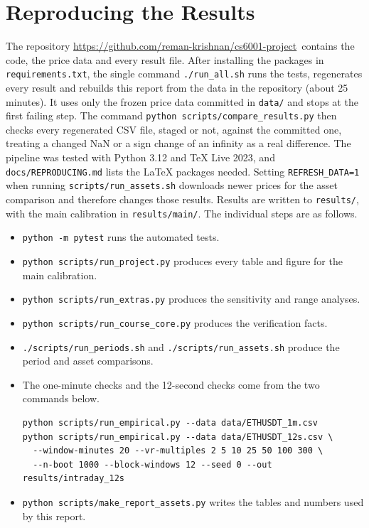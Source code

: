 \documentclass[11pt]{article}
\newcommand{\repo}{\url{https://github.com/reman-krishnan/cs6001-project}}
\begin{document}
\section{Reproducing the Results}
The repository \repo\ contains the code, the price data and every result file. After installing the packages in \verb|requirements.txt|, the single command \verb|./run_all.sh| runs the tests, regenerates every result and rebuilds this report from the data in the repository (about 25 minutes). It uses only the frozen price data committed in \verb|data/| and stops at the first failing step. The command \verb|python scripts/compare_results.py| then checks every regenerated CSV file, staged or not, against the committed one, treating a changed NaN or a sign change of an infinity as a real difference. The pipeline was tested with Python 3.12 and TeX Live 2023, and \verb|docs/REPRODUCING.md| lists the LaTeX packages needed. Setting \verb|REFRESH_DATA=1| when running \verb|scripts/run_assets.sh| downloads newer prices for the asset comparison and therefore changes those results. Results are written to \verb|results/|, with the main calibration in \verb|results/main/|. The individual steps are as follows.
\begin{itemize}\small
\item \verb|python -m pytest| runs the automated tests.
\item \verb|python scripts/run_project.py| produces every table and figure for the main calibration.
\item \verb|python scripts/run_extras.py| produces the sensitivity and range analyses.
\item \verb|python scripts/run_course_core.py| produces the verification facts.
\item \verb|./scripts/run_periods.sh| and \verb|./scripts/run_assets.sh| produce the period and asset comparisons.
\item The one-minute checks and the 12-second checks come from the two commands below.
\begin{verbatim}
python scripts/run_empirical.py --data data/ETHUSDT_1m.csv
python scripts/run_empirical.py --data data/ETHUSDT_12s.csv \
  --window-minutes 20 --vr-multiples 2 5 10 25 50 100 300 \
  --n-boot 1000 --block-windows 12 --seed 0 --out results/intraday_12s
\end{verbatim}
\item \verb|python scripts/make_report_assets.py| writes the tables and numbers used by this report.
\end{itemize}
\end{document}
